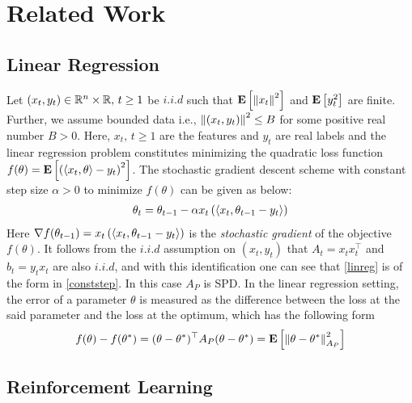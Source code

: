 \section{Related Work}
\subsection{Linear Regression}
Let $(x_t,y_t)\in \mathbb{R}^n\times \mathbb{R},\,t\geq 1$ be $i.i.d$ such that $\mathbf{E}\left[\left\| x_t\right\|^2\right]$ and $\mathbf{E}\left[y_t^2\right]$ are finite. Further, we assume bounded data i.e., $\left\| (x_t,y_t)\right\|^2\leq B$ for some positive real number $B>0$. Here, $x_t,\,t\geq 1$ are the features and $y_t$ are real labels and the linear regression problem constitutes minimizing the quadratic loss function $f(\theta)=\mathbf{E}\left[\left(\langle x_t,\theta\rangle-y_t\right)^2\right]$. The stochastic gradient descent scheme with constant step size $\alpha>0$ to minimize $f(\theta)$ can be given as below:
\begin{align}\label{linreg}
\theta_t=\theta_{t-1}-\alpha x_t\left(\langle x_t,\theta_{t-1} -y_t\rangle\right)
\end{align}
Here $\nabla f(\theta_{t-1})=x_t\left(\langle x_t,\theta_{t-1} -y_t\rangle\right)$ is the \emph{stochastic gradient} of the objective $f(\theta)$. It follows from the $i.i.d$ assumption on $(x_t,y_t)$ that $A_t=x_t x_t^\top$ and $b_t=y_t x_t$ are also $i.i.d$, and with this identification one can see that \eqref{linreg} is of the form in \eqref{conststep}. In this case $A_P$ is SPD.
In the linear regression setting, the error of a parameter $\theta$ is measured as the difference between the loss at the said parameter and the loss at the optimum, which has the following form
\begin{align*}
f(\theta)-f(\theta^*)=(\theta-\theta^*)^\top A_P (\theta-\theta^*)=\mathbf{E}\left[\left\| \theta-\theta^*\right\|^2_{A_P}\right]
\end{align*}

\subsection{Reinforcement Learning}



